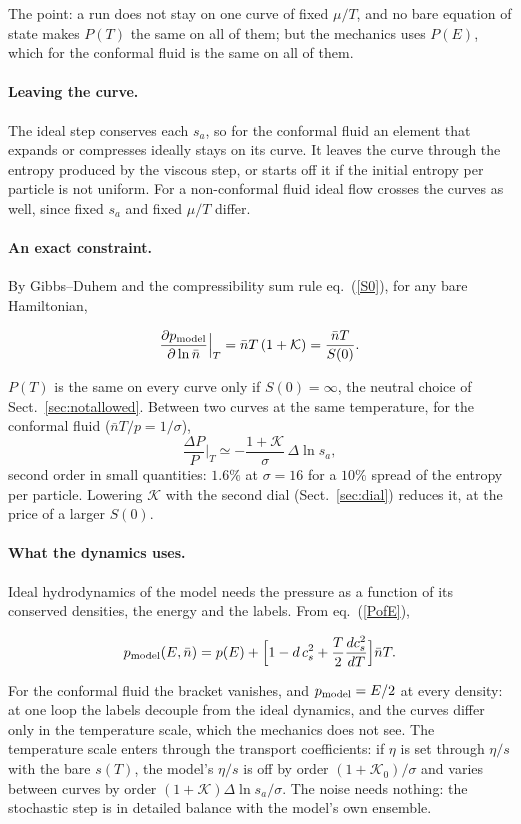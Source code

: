 \documentclass[11pt,aps,preprint,nofootinbib,superscriptaddress,tightenlines]{revtex4-2}
\def\st{\begin{equation}}
\def\stp{\end{equation}}
\def\Eq#1{eq.~(\ref{#1})}
\def\Sect#1{Sect.~\ref{#1}}
\let\oldparagraph\paragraph
\renewcommand{\paragraph}{\par\bigskip\oldparagraph}
\begin{document}
The point: a run does not stay on one curve of fixed $\mu/T$, and no bare equation of state makes $P(T)$ the same on all of them; but the mechanics uses
$P(E)$, which for the conformal fluid is the same on all of them.

\paragraph{Leaving the curve.}  The ideal step conserves each $s_a$, so for the conformal fluid an element that expands or compresses ideally stays on its
curve.  It leaves the curve through the entropy produced by the viscous step, or starts off it if the initial entropy per particle is not uniform.  For a
non-conformal fluid ideal flow crosses the curves as well, since fixed $s_a$ and fixed $\mu/T$ differ.

\paragraph{An exact constraint.}  By Gibbs--Duhem and the compressibility sum rule \Eq{S0}, for any bare Hamiltonian,
\begin{keyeq}
\st
\frac{\partial p_{\rm model}}{\partial\ln\bar n}\Big|_T=\bar nT\,(1+\mathcal K)=\frac{\bar nT}{S(0)} .
\label{constraint}
\stp
\end{keyeq}
$P(T)$ is the same on every curve only if $S(0)=\infty$, the neutral choice of \Sect{sec:notallowed}.  Between two curves at the same temperature, for the conformal fluid
($\bar nT/p=1/\sigma$),
\st
\frac{\Delta P}{P}\Big|_T\simeq-\frac{1+\mathcal K}\sigma\,\Delta\ln s_a ,
\stp
second order in small quantities: $1.6\%$ at $\sigma=16$ for a $10\%$ spread of the entropy per particle.  Lowering $\mathcal K$ with the second dial
(\Sect{sec:dial}) reduces it, at the price of a larger $S(0)$.

\paragraph{What the dynamics uses.}  Ideal hydrodynamics of the model needs the pressure as a function of its conserved densities, the energy and the
labels.  From \Eq{PofE},
\begin{keyeq}
\st
p_{\rm model}(E,\bar n)=p(E)+\Big[1-d\,c_s^2+\frac T2\frac{dc_s^2}{dT}\Big]\bar nT .
\label{PEn}
\stp
\end{keyeq}
For the conformal fluid the bracket vanishes, and $p_{\rm model}=E/2$ at every density: at one loop the labels decouple from the ideal dynamics, and the curves
differ only in the temperature scale, which the mechanics does not see.  The temperature scale enters through the transport coefficients: if $\eta$ is set
through $\eta/s$ with the bare $s(T)$, the model's $\eta/s$ is off by order $(1+\mathcal K_0)/\sigma$ and varies between curves by order
$(1+\mathcal K)\Delta\ln s_a/\sigma$.  The noise needs nothing: the stochastic step is in detailed balance with the model's own ensemble.
\end{document}
